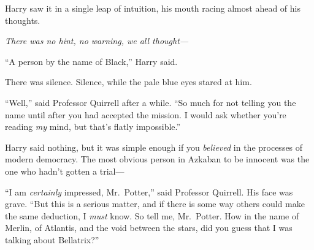 Harry saw it in a single leap of intuition, his mouth racing almost
ahead of his thoughts.

\emph{There was no hint, no warning, we all thought---}

``A person by the name of Black,'' Harry said.

There was silence. Silence, while the pale blue eyes stared at him.

``Well,'' said Professor Quirrell after a while. ``So much for not
telling you the name until after you had accepted the mission. I would
ask whether you're reading \emph{my} mind, but that's flatly
impossible.''

Harry said nothing, but it was simple enough if you \emph{believed} in
the processes of modern democracy. The most obvious person in Azkaban to
be innocent was the one who hadn't gotten a trial---

``I am \emph{certainly} impressed, Mr.~Potter,'' said Professor
Quirrell. His face was grave. ``But this is a serious matter, and if
there is some way others could make the same deduction, I \emph{must}
know. So tell me, Mr.~Potter. How in the name of Merlin, of Atlantis,
and the void between the stars, did you guess that I was talking about
Bellatrix?''
